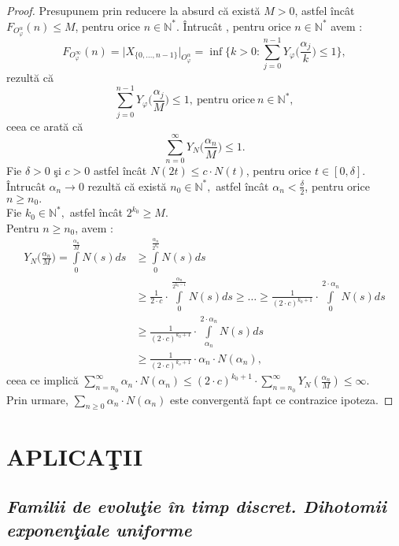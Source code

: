 \documentclass[ a4paper, 12pt]{report}
\theoremstyle{definition}
\theoremstyle{remark}
\numberwithin{equation}{section}
\begin{document}
\begin{proof}
Presupunem prin reducere la absurd c\u a exist\u a $M > 0$, astfel \^inc\^at $F_{O_{\varphi}^{\alpha}}(n) \leq M$, pentru orice $n \in \mathbb{N}^{\ast}$. \^Intruc\^at , pentru orice $n \in \mathbb{N}^{\ast}$ avem : \[F_{O_{\varphi}^{\infty}}(n) = \lvert X_{\{0,\ldots,n-1 \}} \rvert_{O_{\varphi}^{\alpha}} = \inf\Big\{ k>0 : \sum\limits_{j=0}^{n-1} Y_\varphi \Big(\frac{\alpha_j}{k}\Big) \leq 1\Big\},\] rezult\u a c\u a \[\sum\limits_{j=0}^{n-1} Y_\varphi\Big(\frac{\alpha_j}{M}\Big) \leq 1,\ \mbox{pentru orice}\  n \in \mathbb{N}^{\ast},\] ceea ce arat\u a c\u a \[\sum\limits_{n=0}^{\infty}Y_N\Big(\frac{\alpha_n}{M}\Big) \leq 1.\]
Fie $\delta>0$ \c si $c > 0$ astfel \^inc\^at $N(2t) \leq c \cdot N(t)$, pentru orice $t \in [0,\delta]$. \^Intruc\^at $\alpha_n \longrightarrow 0$  rezult\u a c\u a exist\u a $n_0 \in \mathbb{N}^{\ast},$ astfel \^inc\^at $\alpha_n < \frac{\delta}{2}$, pentru orice $n \geq n_0.$\\
Fie $k_0 \in \mathbb{N}^{\ast},$ astfel \^inc\^at $2^{k_{0}} \geq M.$ \\
Pentru $n \geq n_0$, avem :
\begin{align*}
Y_N\Big(\frac{\alpha_n}{M}\Big) = \int\limits_0^{\frac{\alpha_n}{M}} N(s)ds&\geq\int\limits_0^{\frac{\alpha_n}{2^{k_{0}}}} N(s) ds\\
 &\geq \frac{1}{2 \cdot c}\cdot \int\limits_{0}^{\frac{\alpha_n}{2^{k_{0}-1}}} N(s)ds\geq \ldots \geq \frac{1}{(2 \cdot c)^{k_{0}+1}} \cdot \int\limits_{0}^{2 \cdot \alpha_n} N(s)ds\\
   &\geq \frac{1}{(2 \cdot c)^{k_{0}+1}} \cdot \int\limits_{\alpha_n}^{2 \cdot \alpha_n}N(s)ds\\
   &\geq \frac{1}{(2 \cdot c)^{k_{o}+1}} \cdot \alpha_n \cdot N(\alpha_n),
\end{align*} ceea ce implic\u a  $\sum\limits_{n=n_0}^{\infty} \alpha_n \cdot N(\alpha_n) \leq (2 \cdot c)^{k_{0}+1} \cdot \sum\limits_{n=n_0}^{\infty} Y_N(\frac{\alpha_n}{M}) \leq \infty.$\\
Prin urmare, $\sum\limits_{n \geq 0} \alpha_n \cdot N(\alpha_n)$ este convergent\u a  fapt ce contrazice ipoteza.
\end{proof}


\chapter{APLICA\c TII}
\section{\textit{Familii de evolu\c tie \^in timp discret. Dihotomii exponen\c tiale uniforme}}
\end{document}
